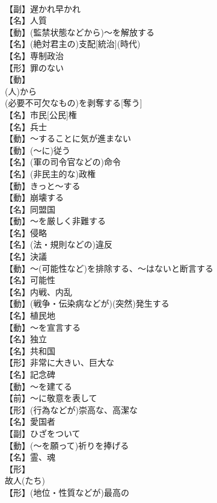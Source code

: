 \documentclass[8pt]{extreport}
\begin{document}
\begin{CJK}{UTF8}{min}
\\	【副】遅かれ早かれ
\\	【名】人質
\\	【動】(監禁状態などから)～を解放する
\\	【名】(絶対君主の)支配[統治](時代)
\\	【名】専制政治
\\	【形】罪のない
\\	【動】
\\	(人)から
\\	(必要不可欠なもの)を剥奪する[奪う]
\\	【名】市民[公民]権
\\	【名】兵士
\\	【動】～することに気が進まない
\\	【動】(～に)従う
\\	【名】(軍の司令官などの)命令
\\	【名】(非民主的な)政権
\\	【動】きっと～する
\\	【動】崩壊する
\\	【名】同盟国
\\	【動】～を厳しく非難する
\\	【名】侵略
\\	【名】(法・規則などの)違反
\\	【名】決議
\\	【動】～(可能性など)を排除する、～はないと断言する
\\	【名】可能性
\\	【名】内戦、内乱
\\	【動】(戦争・伝染病などが)(突然)発生する
\\	【名】植民地
\\	【動】～を宣言する
\\	【名】独立
\\	【名】共和国
\\	【形】非常に大きい、巨大な
\\	【名】記念碑
\\	【動】～を建てる
\\	【前】～に敬意を表して
\\	【形】(行為などが)崇高な、高潔な
\\	【名】愛国者
\\	【副】ひざをついて
\\	【動】(～を願って)祈りを捧げる
\\	【名】霊、魂
\\	【形】
\\	故人(たち)
\\	【形】(地位・性質などが)最高の

\end{CJK}
\end{document}
